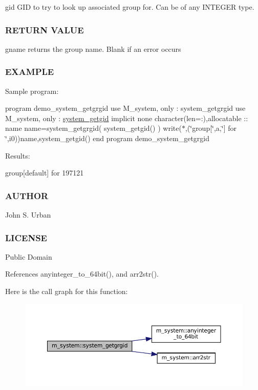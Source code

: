 gid G\+ID to try to look up associated group for. Can be of any I\+N\+T\+E\+G\+ER type.

\subsubsection*{R\+E\+T\+U\+RN V\+A\+L\+UE}

gname returns the group name. Blank if an error occurs

\subsubsection*{E\+X\+A\+M\+P\+LE}

Sample program\+:

program demo\+\_\+system\+\_\+getgrgid use M\+\_\+system, only \+: system\+\_\+getgrgid use M\+\_\+system, only \+: \mbox{\hyperlink{interfacem__system_1_1system__getgid}{system\+\_\+getgid}} implicit none character(len=\+:),allocatable \+:\+: name name=system\+\_\+getgrgid( system\+\_\+getgid() ) write($\ast$,\textquotesingle{}(\char`\"{}group\mbox{[}\char`\"{},a,\char`\"{}\mbox{]} for \char`\"{},i0)\textquotesingle{})name,system\+\_\+getgid() end program demo\+\_\+system\+\_\+getgrgid

Results\+:

group\mbox{[}default\mbox{]} for 197121

\subsubsection*{A\+U\+T\+H\+OR}

John S. Urban \subsubsection*{L\+I\+C\+E\+N\+SE}

Public Domain 

References anyinteger\+\_\+to\+\_\+64bit(), and arr2str().

Here is the call graph for this function\+:
\nopagebreak
\begin{figure}[H]
\begin{center}
\leavevmode
\includegraphics[width=350pt]{namespacem__system_aec137429fbb8c848db4ecd914466d7e8_cgraph}
\end{center}
\end{figure}
\mbox{\label{namespacem__system_a96fab225737afb77ff1cbba9866f0d05}} 
